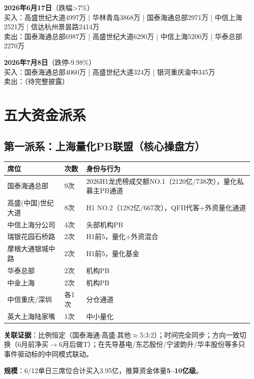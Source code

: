 \documentclass[a4paper,11pt,fontset=none]{ctexart}
\begin{document}
\vspace{0.4em}
\textbf{2026年6月17日}（跌幅>7\%）\\
买入：高盛世纪大道4997万 | 华林青岛3868万 | 国泰海通总部2971万 | 中信上海2521万 | 信达杭州景昙路2414万\\
卖出：国泰海通总部6987万 | 高盛世纪大道6290万 | 中信上海5200万 | 华泰总部2270万

\vspace{0.4em}
\textbf{2026年7月8日}（跌停-9.98\%）\\
买入：国泰海通总部4060万 | 高盛世纪大道324万 | 银河重庆渝中345万\\
卖出：（待完整披露）

\section{五大资金派系}

\subsection*{第一派系：上海量化PB联盟（核心操盘方）}

\begin{tabularx}{\textwidth}{L{3.5cm}L{1.5cm}X}
\toprule
\textbf{席位} & \textbf{次数} & \textbf{身份与行为} \\
\midrule
国泰海通总部 & 9次 & 2026H1龙虎榜成交额NO.1（2120亿/738次），量化私募主PB通道 \\
高盛(中国)世纪大道 & 8次 & H1 NO.2（1282亿/667次），QFII代客+外资量化通道 \\
中信上海分公司 & 4次 & 头部机构PB \\
瑞银花园石桥路 & 2次 & H1前5，量化+外资混合 \\
摩根大通银城中路 & 2次 & H1前5，量化基金 \\
华泰总部 & 2次 & 机构PB \\
中金上海 & 2次 & 机构PB \\
中信重庆/深圳 & 各1次 & 分仓通道 \\
英大上海陆家嘴 & 1次 & 中小量化 \\
\bottomrule
\end{tabularx}

\textbf{关联证据}：比例恒定（国泰海通:高盛:其他$\approx$5:3:2）；时间完全同步；方向一致切换（6月前净买$\to$6月后做T）；在先导基电/东芯股份/宁波韵升/华丰股份等多只事件驱动标的中同模式联动。

\textbf{规模}：6/12单日三席位合计买入3.95亿，推算资金体量\textbf{5--10亿级}。
\end{document}
